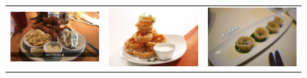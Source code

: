 \documentclass[letterpaper, 10 pt, conference]{ieeeconf}
\begin{document}
\begin{figure}
\begin{center}
\begin{tabular}{lll}
\includegraphics[scale = .23]{c4} & \includegraphics[scale = .23]{c5} & \includegraphics[scale = .23]{c6} \\

\end{tabular}
\end{center}
\end{figure}
\end{document}
